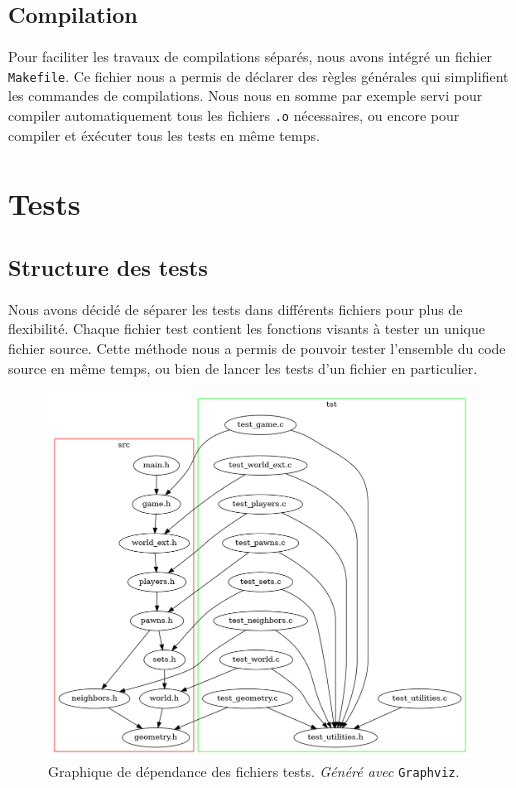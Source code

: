     \subsection{Compilation}
        Pour faciliter les travaux de compilations séparés, nous avons intégré un fichier \texttt{Makefile}. Ce fichier nous a permis de déclarer des règles générales qui simplifient les commandes de compilations. Nous nous en somme par exemple servi pour compiler automatiquement tous les fichiers \texttt{.o} nécessaires, ou encore pour compiler et éxécuter tous les tests en même temps.

\section{Tests}
    \subsection{Structure des tests}
        Nous avons décidé de séparer les tests dans différents fichiers pour plus de flexibilité. Chaque fichier test contient les fonctions visants à tester un unique fichier source. Cette méthode nous a permis de pouvoir tester l'ensemble du code source en même temps, ou bien de lancer les tests d'un fichier en particulier.

        \begin{figure}[H]
            \centering
            \includegraphics[scale=0.4]{img/graph_tst.png}
            \caption{Graphique de dépendance des fichiers tests. \textit{Généré avec} \texttt{Graphviz}.}
            \label{fig:graph_tst}
        \end{figure}

